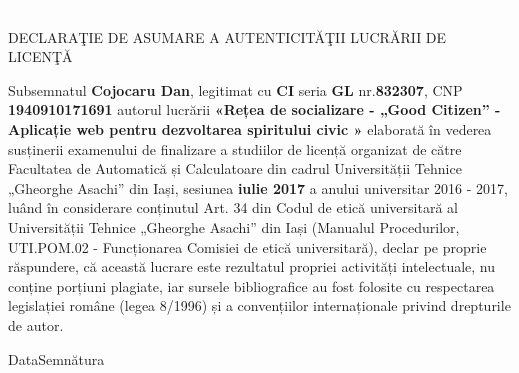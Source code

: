 \textcolor{white}{.}
\begin{center}
\LARGE{DECLARAŢIE DE ASUMARE A AUTENTICITĂŢII LUCRĂRII DE LICENŢĂ}
\end{center}


Subsemnatul \textbf{Cojocaru Dan}, legitimat cu \textbf{CI} seria
\textbf{GL} nr.\textbf{832307}, CNP \textbf{1940910171691} autorul lucrării
\textbf{«Rețea de socializare - „Good Citizen” - Aplicație web pentru dezvoltarea spiritului civic »} elaborată în
vederea susținerii examenului de finalizare a studiilor de licență organizat
de către Facultatea de Automatică și Calculatoare din cadrul Universității
Tehnice „Gheorghe Asachi” din Iași, sesiunea \textbf{iulie 2017} a anului
universitar 2016 - 2017, luând în considerare conținutul Art. 34 din Codul de
etică universitară al Universității Tehnice „Gheorghe Asachi” din Iași
(Manualul Procedurilor, UTI.POM.02 - Funcționarea Comisiei de etică
universitară), declar pe proprie răspundere, că această lucrare este
rezultatul propriei activități intelectuale, nu conține porțiuni plagiate, iar
sursele bibliografice au fost folosite cu respectarea legislației române (legea
8/1996) și a convențiilor internaționale privind drepturile de autor.

\noindent \hfill Data\hfill \hfill Semnătura \hfill